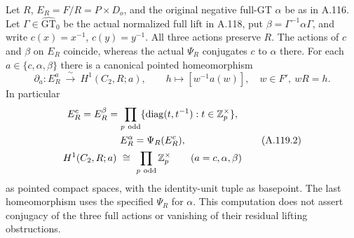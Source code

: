 Let \(R\), \(E_R=F/R=P\times D_o\), and the original negative
full-GT \(\alpha\) be as in A.116.
Let \(\Gamma\in\widehat{\mathrm{GT}}_0\) be the actual normalized
full lift in A.118, put \(\beta=\Gamma^{-1}\alpha\Gamma\), and
write \(c(x)=x^{-1}\), \(c(y)=y^{-1}\).
All three actions preserve \(R\).
The actions of \(c\) and \(\beta\) on \(E_R\) coincide, whereas
the actual \(\Psi_R\) conjugates \(c\) to \(\alpha\) there.
For each \(a\in\{c,\alpha,\beta\}\) there is a canonical pointed
homeomorphism
\[
 \partial_a:E_R^a\ \xrightarrow{\ \sim\ }\ H^1(C_2,R;a),
 \qquad h\longmapsto[w^{-1}a(w)],\quad w\in F',\ wR=h.
 \tag{A.119.1}
\]
In particular
\[
 \begin{gathered}
 E_R^c=E_R^\beta
   =\prod_{p\ {\rm odd}}
       \{\operatorname{diag}(t,t^{-1}):t\in\mathbb Z_p^\times\},\\
 E_R^\alpha=\Psi_R(E_R^c),\\
 H^1(C_2,R;a)\ \cong\ \prod_{p\ {\rm odd}}\mathbb Z_p^\times
           \qquad(a=c,\alpha,\beta)
 \end{gathered}
 \tag{A.119.2}
\]
as pointed compact spaces, with the identity-unit tuple as basepoint.
The last homeomorphism uses the specified \(\Psi_R\) for \(\alpha\).
This computation does not assert conjugacy of the three full
actions or vanishing of their residual lifting obstructions.

